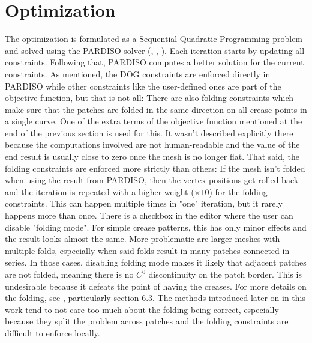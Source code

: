 \documentclass[a4paper,twoside,12pt,nochapterprefix]{scrbook}
\begin{document}
\section{Optimization}\label{sec:optimization}
The optimization is formulated as a Sequential Quadratic Programming problem and solved using the PARDISO solver (\cite{pardiso-6.0a}, \cite{pardiso-6.0b}, \cite{pardiso-6.0c}). Each iteration starts by updating all constraints. Following that, PARDISO computes a better solution for the current constraints. As mentioned, the DOG constraints are enforced directly in PARDISO while other constraints like the user-defined ones are part of the objective function, but that is not all:\newline
There are also folding constraints which make sure that the patches are folded in the same direction on all crease points in a single curve. One of the extra terms of the objective function mentioned at the end of the previous section is used for this. It wasn't described explicitly there because the computations involved are not human-readable and the value of the end result is usually close to zero once the mesh is no longer flat.\newline
That said, the folding constraints are enforced more strictly than others: If the mesh isn't folded when using the result from PARDISO, then the vertex positions get rolled back and the iteration is repeated with a higher weight ($\times 10$) for the folding constraints. This can happen multiple times in "one" iteration, but it rarely happens more than once.\newline
There is a checkbox in the editor where the user can disable "folding mode". For simple crease patterns, this has only minor effects and the result looks almost the same. More problematic are larger meshes with multiple folds, especially when said folds result in many patches connected in series. In those cases, disabling folding mode makes it likely that adjacent patches are not folded, meaning there is no $C^0$ discontinuity on the patch border. This is undesirable because it defeats the point of having the creases.\newline
For more details on the folding, see \cite{Rabinovich:CurvedFolds:2019}, particularly section 6.3. The methods introduced later on in this work tend to not care too much about the folding being correct, especially because they split the problem across patches and the folding constraints are difficult to enforce locally.\newline
\end{document}
